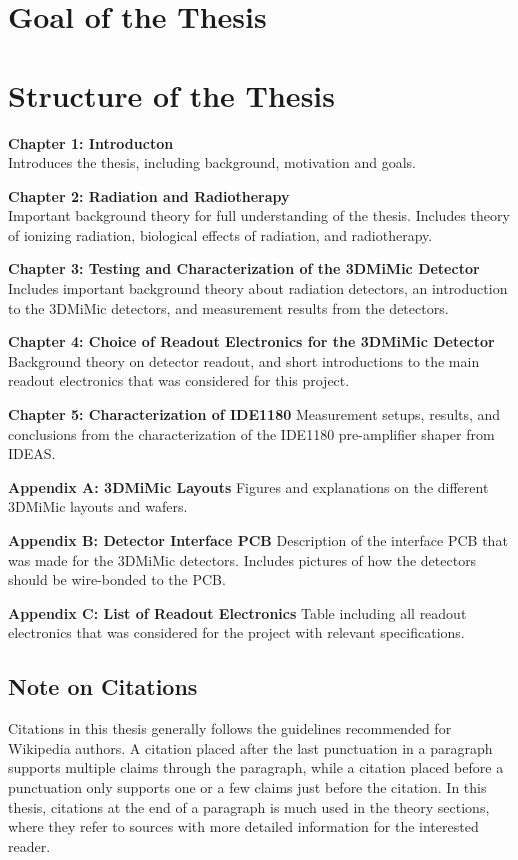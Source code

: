 \documentclass[../main/thesis.tex]{subfiles}
\begin{document}
\section{Goal of the Thesis}
\label{i-goal}




\section{Structure of the Thesis}
\label{i-structure}
\textbf{Chapter 1: Introducton}\\
Introduces the thesis, including background, motivation and goals.

\textbf{Chapter 2: Radiation and Radiotherapy}\\
Important background theory for full understanding of the thesis. Includes theory of ionizing radiation, biological effects of radiation, and radiotherapy.

\textbf{Chapter 3: Testing and Characterization of the 3DMiMic Detector}
Includes important background theory about radiation detectors, an introduction to the 3DMiMic detectors, and measurement results from the detectors.

\textbf{Chapter 4: Choice of Readout Electronics for the 3DMiMic Detector}
Background theory on detector readout, and short introductions to the main readout electronics that was considered for this project.

\textbf{Chapter 5: Characterization of IDE1180}
Measurement setups, results, and conclusions from the characterization of the IDE1180 pre-amplifier shaper from IDEAS.

\textbf{Appendix A: 3DMiMic Layouts}
Figures and explanations on the different 3DMiMic layouts and wafers. 

\textbf{Appendix B: Detector Interface PCB}
Description of the interface PCB that was made for the 3DMiMic detectors. Includes pictures of how the detectors should be wire-bonded to the PCB. 

\textbf{Appendix C: List of Readout Electronics}
Table including all readout electronics that was considered for the project with relevant specifications. 

\subsection{Note on Citations}
Citations in this thesis generally follows the guidelines recommended for Wikipedia authors. A citation placed after the last punctuation in a paragraph supports multiple claims through the paragraph, while a citation placed before a punctuation only supports one or a few claims just before the citation. In this thesis, citations at the end of a paragraph is much used in the theory sections, where they refer to sources with more detailed information for the interested reader.
\end{document}
